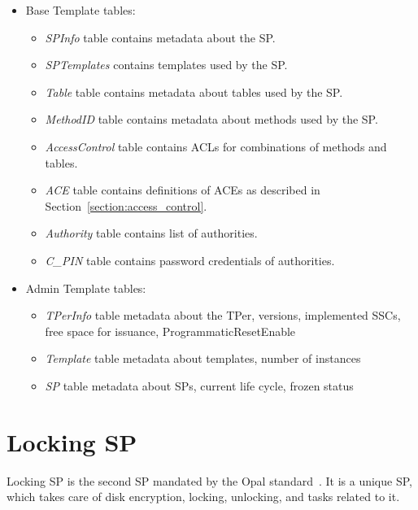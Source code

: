 \begin{itemize}
    \item Base Template tables:
\begin{itemize}
    \item \emph{SPInfo} table contains metadata about the SP.
    \item \emph{SPTemplates} contains templates used by the SP.
    \item \emph{Table} table contains metadata about tables used by the SP.
    \item \emph{MethodID} table contains metadata about methods used by the SP.
    \item \emph{AccessControl} table contains ACLs for combinations of methods and tables.
    \item \emph{ACE} table contains definitions of ACEs as described in Section~\ref{section:access_control}.
    \item \emph{Authority} table contains list of authorities.
    \item \emph{C\_PIN} table contains password credentials of authorities.
\end{itemize}
    \item Admin Template tables:
\begin{itemize}
    \item \emph{TPerInfo} table metadata about the TPer, versions, implemented SSCs, free space for issuance, ProgrammaticResetEnable
    \item \emph{Template} table metadata about templates, number of instances
    \item \emph{SP} table metadata about SPs, current life cycle, frozen status
\end{itemize}
\end{itemize}


\section{Locking SP}
\label{locking_sp}

Locking SP is the second SP mandated by the Opal standard~\cite{tcg-opal2}. It is a unique SP, which takes care of disk encryption, locking, unlocking, and tasks related to it.

